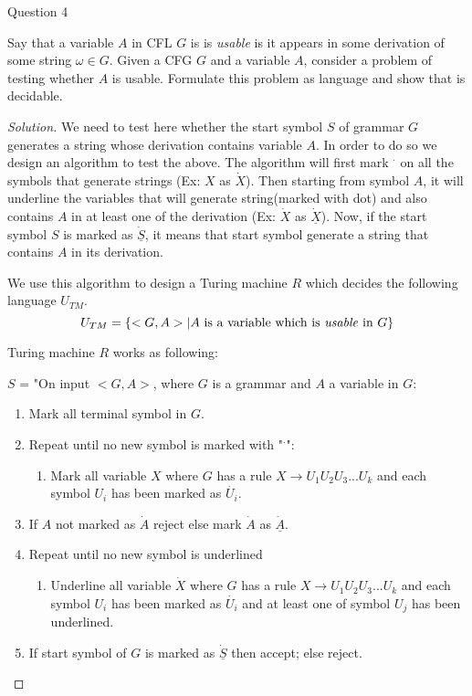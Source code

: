 \begin{solution}{Question 4}\label{ques:4}
    \begin{question}
        Say that a variable $A$ in CFL $G$ is is \emph{usable} is it appears in some derivation of some string $\omega \in G$. Given a CFG $G$ and a variable $A$, consider a problem of testing whether $A$ is usable. Formulate this problem as language and show that is decidable.
    \end{question}
    \tcblower{}
    \begin{proof}[Solution]
        We need to test here whether the start symbol $S$ of grammar $G$ generates a string whose derivation contains variable $A$. In order to do so we design an algorithm to test the above. The algorithm will first mark $^\cdot$ on all the symbols that generate strings (Ex: $X$ as $\dot{X}$). Then starting from symbol $A$, it will underline the variables that will generate string(marked with dot) and also contains $A$ in at least one of the derivation (Ex: $\dot{X}$ as $\underline{\dot{X}}$). Now, if the start symbol $S$ is marked as $\underline{\dot{S}}$, it means that start symbol generate a string that contains $A$ in its derivation.
        
        \bigskip
        
        We use this algorithm to design a Turing machine $R$ which decides the following language $U_{TM}$.
        \[U_{TM} = \{<G, A> | A \text{ is a variable which is \emph{usable} in } G \}\]
        
        Turing machine $R$ works as following:
        
        \bigskip
        
        $S$ = "On input $<G, A>$, where $G$ is a grammar and $A$ a variable in $G$:
        \begin{enumerate}
            \item Mark all terminal symbol in $G$.
            \item Repeat until no new symbol is marked with "$^\cdot$":
            \begin{enumerate}
                \item Mark all variable $X$ where $G$ has a rule $X \longrightarrow U_1U_2U_3...U_k$ and each symbol $U_i$ has been marked as $\dot{U_i}$.
            \end{enumerate}
            \item If $A$ not marked as $\dot{A}$ reject else mark $\dot{A}$ as $\underline{\dot{A}}$.
            \item Repeat until no new symbol is underlined
            \begin{enumerate}
                \item Underline all variable $\dot{X}$ where $G$ has a rule  $X \longrightarrow U_1U_2U_3...U_k$ and each symbol $U_i$ has been marked as $\dot{U_i}$ and at least one of symbol $U_j$ has been underlined.
            \end{enumerate}
            \item If start symbol of $G$ is marked as $\underline{\dot{S}}$ then accept; else reject.
        \end{enumerate}
        

\end{proof}
\end{solution}
